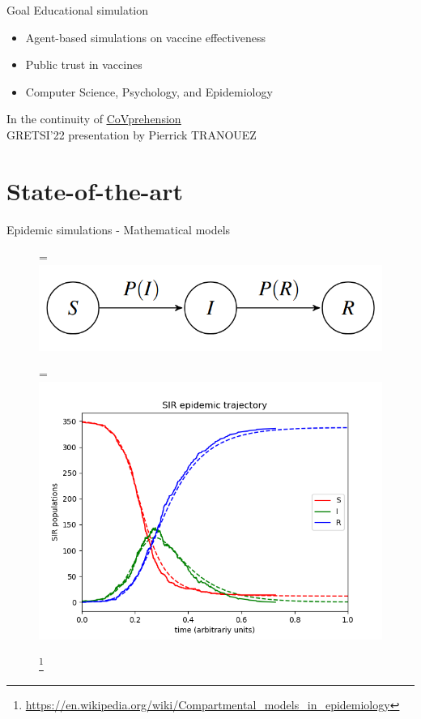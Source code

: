 \documentclass{beamer}
\newcommand{\vcenteredhbox}[1]{\begingroup
\setbox0=\hbox{#1}\parbox{\wd0}{\box0}\endgroup}
\begin{document}
\begin{frame}{Goal}
    Educational simulation
    \begin{itemize}
        \item Agent-based simulations on vaccine effectiveness
        \item Public trust in vaccines
        \item Computer Science, Psychology, and Epidemiology
    \end{itemize}
    \vspace{2\baselineskip}
    In the continuity of \href{https://covprehension.org/}{\ul{CoVprehension}}
    \vspace{\baselineskip}
    \\GRETSI'22 presentation by Pierrick TRANOUEZ
\end{frame}



\section{State-of-the-art}

\begin{frame}{Epidemic simulations - Mathematical models}
    \begin{figure}[htpb]
        \begin{center}
            \vcenteredhbox{\includegraphics[width=0.4\linewidth]{fig/SIR_diagram.png}}
            \vcenteredhbox{\includegraphics[width=0.5\linewidth]{fig/SIR_graph.png}}
            \footnote{{\tiny \url{https://en.wikipedia.org/wiki/Compartmental_models_in_epidemiology}}}
        \end{center}
    \end{figure}
\end{frame}
\end{document}
